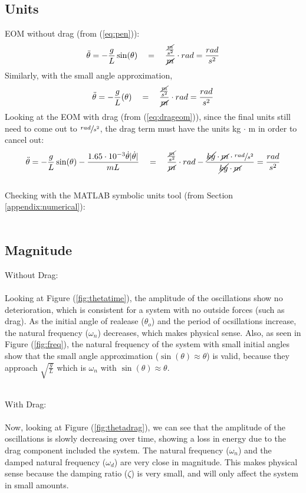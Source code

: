 \documentclass[12pt]{report}
\begin{document}
\begin{flushleft}
\subsection{Units}
EOM without drag (from (\ref{eq:pen})):
$$
\ddot{\theta} = -\frac{g}{L}\sin(\theta) \quad = \quad
\frac{\frac{\cancel{m}}{s^2}}{\cancel{m}}\cdot rad = \frac{rad}{s^2}
$$
Similarly, with the small angle approximation,
$$
\ddot{\theta} = -\frac{g}{L}(\theta) \quad = \quad
\frac{\frac{\cancel{m}}{s^2}}{\cancel{m}}\cdot rad = \frac{rad}{s^2}
$$
Looking at the EOM with drag (from (\ref{eq:drageom})), since the final units still need to come out to $\sfrac{rad}{s^2}$, the drag term must have the units kg $\cdot$ m in order to cancel out: \\
$$
\ddot{\theta} = -\frac{g}{L}\sin(\theta) - \frac{1.65 \cdot 10^{-3}\dot{\theta}|\dot{\theta}|}{mL} \quad = \quad
\frac{\frac{\cancel{m}}{s^2}}{\cancel{m}} \cdot rad - \frac{\cancel{kg} \cdot \cancel{m}\cdot \sfrac{rad}{s^2}}{\cancel{kg}\cdot\cancel{m}}
=
\frac{rad}{s^2}
$$
~\\
Checking with the MATLAB symbolic units tool (from Section \ref{appendix:numerical}): \\
~\\

\newpage
\subsection{Magnitude}
Without Drag: \\
~\\
Looking at Figure (\ref{fig:thetatime}), the amplitude of the oscillations show no
deterioration, which is consistent for a system with no outside forces (such as drag).
As the initial angle of realease ($\theta_o$) and the period of ocsillations increase, the
natural frequency ($\omega_n$) decreases, which makes physical sense. Also, as seen in
Figure (\ref{fig:freq}), the natural frequency of the system with small initial angles
show that the small angle approximation ($\sin(\theta) \approx \theta$) is valid,
because they approach $\sqrt{\frac{g}{L}}$ which is $\omega_n$ with $\sin(\theta) \approx \theta$.

~\\
With Drag: \\
~\\
Now, looking at Figure (\ref{fig:thetadrag}), we can see that the amplitude of the
oscillations is slowly decreasing over time, showing a loss in energy due to the
drag component included the system. The natural frequency ($\omega_n$) and the damped
natural frequency ($\omega_d$) are very close in magnitude. This makes physical sense because
the damping ratio ($\zeta$) is very small, and will only affect the system in small amounts.


\end{flushleft}
\end{document}
